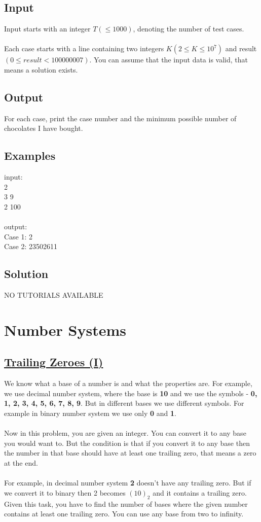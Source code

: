 \documentclass[10pt,a4paper]{article}
\begin{document}
\subsection*{Input}
Input starts with an integer $T (\leq 1000)$, denoting the number of test cases.
\\ \\
Each case starts with a line containing two integers $K (2 \leq K \leq 10^7)$ and result $(0 \leq result < 100000007)$. You can assume that the input data is valid, that means a solution exists.

\subsection*{Output}
For each case, print the case number and the minimum possible number of chocolates I have bought.

\subsection*{Examples}
input: \\
2 \\
3 9 \\
2 100 \\
\\
output: \\ 
Case 1: 2 \\
Case 2: 23502611

\subsection*{Solution}
NO TUTORIALS AVAILABLE


\section{Number Systems}
\subsection*{\hyperlink{https://lightoj.com/problem/trailing-zeroes-i}{\underline{Trailing Zeroes (I)}}}
We know what a base of a number is and what the properties are. For example, we use decimal number system, where the base is \textbf{10} and we use the symbols - \textbf{{0, 1, 2, 3, 4, 5, 6, 7, 8, 9}}. But in different bases we use different symbols. For example in binary number system we use only \textbf{0} and \textbf{1}.
\\ \\
Now in this problem, you are given an integer. You can convert it to any base you would want to. But the condition is that if you convert it to any base then the number in that base should have at least one trailing zero, that means a zero at the end.
\\ \\
For example, in decimal number system \textbf{2} doesn't have any trailing zero. But if we convert it to binary then 2 becomes $(10)_2$ and it contains a trailing zero. Given this task, you have to find the number of bases where the given number contains at least one trailing zero. You can use any base from two to infinity.
\end{document}

